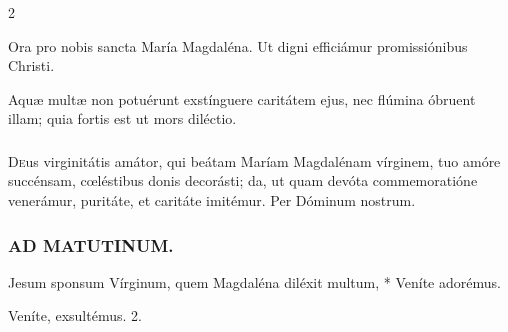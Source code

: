 \documentclass[9pt,twoside]{extarticle}
\begin{document}
\begin{multicols}{2}
\begin{tightlist}{}
\item {} Ora pro nobis sancta María Magdaléna.  Ut digni efficiámur promissiónibus Christi.
\item {} Aquæ multæ non potuérunt exstínguere caritátem ejus, nec flúmina óbruent illam; quia fortis est ut mors diléctio.
\end{tightlist}

\subsubsection*{\center {}}
\lettrine{D}eus virginitátis amátor, qui beátam Maríam Magdalénam vírginem, tuo amóre succénsam, cœléstibus donis decorásti; da, ut quam devóta commemoratióne venerámur, puritáte, et caritáte imitémur. Per Dóminum nostrum.

\subsubsection*{\center \textsc{AD MATUTINUM.}}
\begin{tightlist}{}
\item {} Jesum sponsum Vírginum, quem Magdaléna diléxit multum, * Veníte adorémus.
\item {} Veníte, exsultémus. 2.
\end{tightlist}


\end{multicols}
\end{document}
